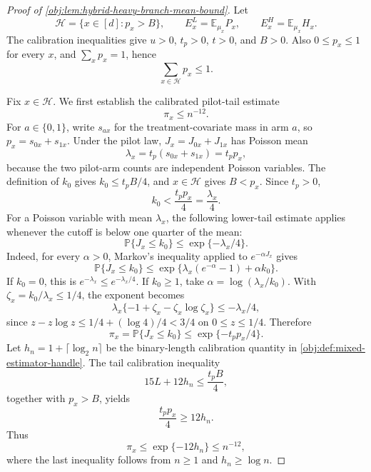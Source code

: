\begin{proof}[Proof of \cref{obj:lem:hybrid-heavy-branch-mean-bound}]
Let
\[
\mathcal H=\{x\in[d]:p_x>B\},\qquad
E^L_x=\mathbb E_{\mu_x}P_x,\qquad
E^H_x=\mathbb E_{\mu_x}H_x .
\]
The calibration inequalities give \(u>0\), \(t_p>0\), \(t>0\), and \(B>0\). Also \(0\le p_x\le1\) for every \(x\), and \(\sum_xp_x=1\), hence
\[
\sum_{x\in\mathcal H}p_x\le1 .
\]

Fix \(x\in\mathcal H\). We first establish the calibrated pilot-tail estimate
\[
\pi_x\le n^{-12}.
\]
For \(a\in\{0,1\}\), write \(s_{ax}\) for the treatment-covariate mass in arm \(a\), so \(p_x=s_{0x}+s_{1x}\). Under the pilot law, \(J_x=J_{0x}+J_{1x}\) has Poisson mean
\[
\lambda_x=t_p(s_{0x}+s_{1x})=t_pp_x,
\]
because the two pilot-arm counts are independent Poisson variables. The definition of \(k_0\) gives \(k_0\le t_pB/4\), and \(x\in\mathcal H\) gives \(B<p_x\). Since \(t_p>0\),
\[
k_0<\frac{t_pp_x}{4}=\frac{\lambda_x}{4}.
\]
For a Poisson variable with mean \(\lambda_x\), the following lower-tail estimate applies whenever the cutoff is below one quarter of the mean:
\[
\mathbb P\{J_x\le k_0\}\le \exp\{-\lambda_x/4\}.
\]
Indeed, for every \(\alpha>0\), Markov's inequality applied to \(e^{-\alpha J_x}\) gives
\[
\mathbb P\{J_x\le k_0\}
\le
\exp\{\lambda_x(e^{-\alpha}-1)+\alpha k_0\}.
\]
If \(k_0=0\), this is \(e^{-\lambda_x}\le e^{-\lambda_x/4}\). If \(k_0\ge1\), take \(\alpha=\log(\lambda_x/k_0)\). With \(\zeta_x=k_0/\lambda_x\le1/4\), the exponent becomes
\[
\lambda_x\{-1+\zeta_x-\zeta_x\log\zeta_x\}
\le -\lambda_x/4,
\]
since \(z-z\log z\le 1/4+(\log 4)/4<3/4\) on \(0\le z\le1/4\). Therefore
\[
\pi_x=\mathbb P\{J_x\le k_0\}\le \exp\{-t_pp_x/4\}.
\]
Let \(h_n=1+\lceil\log_2 n\rceil\) be the binary-length calibration quantity in \cref{obj:def:mixed-estimator-handle}. The tail calibration inequality
\[
15L+12h_n\le \frac{t_pB}{4},
\]
together with \(p_x>B\), yields
\[
\frac{t_pp_x}{4}\ge 12h_n.
\]
Thus
\[
\pi_x\le \exp\{-12h_n\}\le n^{-12},
\]
where the last inequality follows from \(n\ge1\) and \(h_n\ge \log n\).


\end{proof}
